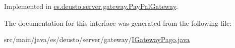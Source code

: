 Implemented in \mbox{\hyperlink{classes_1_1deusto_1_1server_1_1gateway_1_1_pay_pal_gateway_a001d981b8bc619f54230b669475d41b6}{es.\+deusto.\+server.\+gateway.\+Pay\+Pal\+Gateway}}.



The documentation for this interface was generated from the following file\+:\begin{DoxyCompactItemize}
\item 
src/main/java/es/deusto/server/gateway/\mbox{\hyperlink{_i_gateway_pago_8java}{I\+Gateway\+Pago.\+java}}\end{DoxyCompactItemize}
